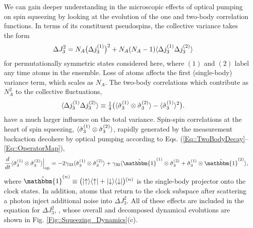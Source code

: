 \documentclass[preprint, aps,pra,onecolumn]{revtex4-1} %
\newcommand{\varz}{\Delta J_3^2}
\newcommand{\NA}{\tilde{N}_A}
\begin{document}
We can gain deeper understanding in the microscopic effects of optical pumping on spin squeezing by looking at the evolution of the one and two-body correlation functions.  In terms of its constituent pseudospins, the collective variance takes the form
	\begin{align}
	\varz & = N_A \big( \Delta j_3^{(1)} \big)^2 + N_A(N_A-1) \expt{ \Delta j_3^{(1)} \Delta j_3^{(2)} }
	\end{align}
for permutationally symmetric states considered here, {\color{blue} where $(1)$ and $(2)$ label any time atoms in the ensemble}. Loss of atoms affects the first (single-body) variance term, which scales as $N_A$.
The two-body correlations which contribute as $N_A^2$ to the collective fluctuations, 
	\begin{align}
		\langle{ \Delta j_3^{(1)} \Delta j_3^{(2)} }\rangle &\equiv \mbox{$\frac{1}{4}$} \big( \langle{ \hat{\sigma}_3^{(1)} \otimes \hat{\sigma}_3^{(2)}  }\rangle - \langle{\hat{\sigma}_3^{(1)} }\rangle^2  \big).
\end{align}
have a much larger influence on the total variance. Spin-spin correlations at the heart of spin squeezing, $\langle{ \hat{\sigma}_3^{(1)} \otimes \hat{\sigma}_3^{(2)} }\rangle$, rapidly generated by the measurement backaction decohere by optical pumping according to Eqs. (\ref{Eq::TwoBodyDecay}--\ref{Eq::OperatorMap}),
	\begin{align} \label{Eq::TwoBodySpinDecay}
		\frac{d}{dt} \expt{\hat{\sigma}_3^{(1)} \otimes \hat{\sigma}_3^{(2)} }  \Big|_{\rm op} = - 2 \gamma_{33}  \expt{\hat{\sigma}_3^{(1)} \otimes \hat{\sigma}_3^{(2)}} + \gamma_{30} \expt{ \hat{\mathbbm{1}}^{(1)} \otimes \hat{\sigma}_3^{(2)} + \hat{\sigma}_3^{(1)} \otimes \hat{\mathbbm{1}}^{(2)} },
	\end{align}
where $\hat{\mathbbm{1}}^{(n)} \equiv \big( \op{\uparrow}{\uparrow} + \op{\downarrow}{\downarrow} \big){}^{(n)}$ is the single-body projector onto the clock states. 
In addition, atoms that return to the clock subspace after scattering a photon inject additional noise into $\varz$.  
All of these effects are included in the equation for $\varz$, , whose overall and decomposed dynamical evolutions are shown in Fig. \ref{Fig::Squeezing_Dynamics}(c). 
\end{document}
